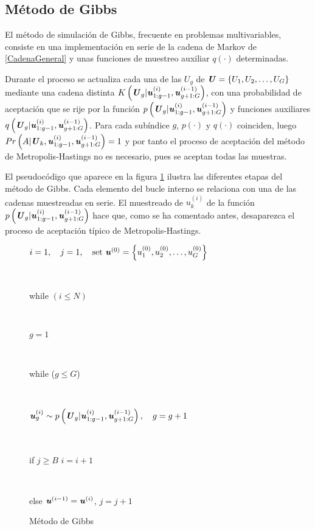 \subsection{Método de Gibbs}
El método de simulación de Gibbs, frecuente en problemas multivariables, consiste en una implementación en serie de la cadena de Markov de \ref{CadenaGeneral} y unas funciones de muestreo auxiliar $q(\cdot)$ determinadas. 

Durante el proceso se actualiza cada una de las $U_{g}$ de $\textbf{\textit{U}} = \left\{U_{1}, U_{2}, \dots , U_{G}\right\}$ mediante una cadena distinta $K\left(\textbf{\textit{U}}_{g}|\textbf{\textit{u}}^{(i)}_{1:g-1}, \textbf{\textit{u}}^{(i-1)}_{g+1:G}\right)$, con una probabilidad de aceptación que se rije por la función $p\left(\textbf{\textit{U}}_{g}|\textbf{\textit{u}}^{(i)}_{1:g-1}, \textbf{\textit{u}}^{(i-1)}_{g+1:G}\right)$ y funciones auxiliares $q\left(\textbf{\textit{U}}_{g}|\textbf{\textit{u}}^{(i)}_{1:g-1}, \textbf{\textit{u}}^{(i-1)}_{g+1:G}\right)$. Para cada subíndice $\textit{g}$, $p(\cdot)$ y $q(\cdot)$ coinciden, luego \textcolor{red}{$Pr\left(A|\textbf{\textit{U}}_{k},\textbf{\textit{u}}^{(i)}_{1:g-1}, \textbf{\textit{u}}^{(i-1)}_{g+1:G}\right) = 1$} y por tanto el proceso de aceptación del método de Metropolis-Hastings no es necesario, pues se aceptan todas las muestras.

El pseudocódigo que aparece en la figura \ref{fig:3.6} ilustra las diferentes etapas del método de Gibbs. Cada elemento del bucle interno se relaciona con una de las cadenas muestreadas en serie. El muestreado de $u_k^{(i)}$ de la función $p\left(\textbf{\textit{U}}_{g}|\textbf{\textit{u}}^{(i)}_{1:g-1}, \textbf{\textit{u}}^{(i-1)}_{g+1:G}\right)$ hace que, como se ha comentado antes, desaparezca el proceso de aceptación típico de Metropolis-Hastings.
\begin{figure}[ht]
    \centering
    \begin{tcolorbox}[colframe=black, colback=white, boxrule=0.5pt, width=0.6\textwidth, sharp corners]
        \parbox[t]{\linewidth}{$i=1, \quad j=1, \quad \text{set } \textbf{\textit{u}}^{(0)} = \left\{u^{(0)}_{1}, u^{(0)}_{2}, \dots, u^{(0)}_{G}\right\}$} \\[0.5em]
        \parbox[t]{\linewidth}{while $(i \leq N)$} \\[0.5em]
        \parbox[t]{\linewidth}{\hspace{1em} $g = 1$} \\[0.5em]
        \parbox[t]{\linewidth}{\hspace{1em} while ($g \leq G$)} \\[0.5em]
        \parbox[t]{\linewidth}{\hspace{2em} $\textbf{\textit{u}}^{(i)}_g \sim p\left(\textbf{\textit{U}}_{g}|\textbf{\textit{u}}^{(i)}_{1:g-1}, \textbf{\textit{u}}^{(i-1)}_{g+1:G}\right), \quad g = g+1$} \\[0.5em]
        \parbox[t]{\linewidth}{\hspace{1em} if $j \geq B$  $i = i+1$} \\[0.5em]
        \parbox[t]{\linewidth}{\hspace{1em} else $\textbf{\textit{u}}^{(i-1)} = \textbf{\textit{u}}^{(i)}$, \quad $j = j+1$}
    \end{tcolorbox}
    \caption{Método de Gibbs}
    \label{fig:3.6}
\end{figure}

